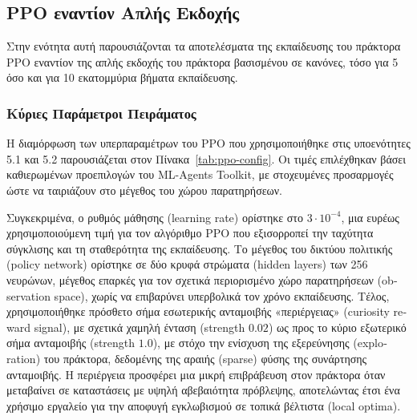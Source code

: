 \documentclass[12pt]{article}
\begin{document}
\subsection{PPO εναντίον Απλής Εκδοχής}
Στην ενότητα αυτή παρουσιάζονται τα αποτελέσματα της εκπαίδευσης του πράκτορα PPO εναντίον της απλής εκδοχής του πράκτορα βασισμένου σε κανόνες, τόσο για 5 όσο και για 10 εκατομμύρια βήματα εκπαίδευσης.

\subsubsection{Κύριες Παράμετροι Πειράματος}
Η διαμόρφωση των υπερπαραμέτρων του PPO που χρησιμοποιήθηκε στις υποενότητες 5.1 και 5.2 παρουσιάζεται στον Πίνακα~\ref{tab:ppo-config}.  Οι τιμές επιλέχθηκαν βάσει καθιερωμένων προεπιλογών του ML-Agents Toolkit, με στοχευμένες προσαρμογές ώστε να ταιριάζουν στο μέγεθος του χώρου παρατηρήσεων. 

Συγκεκριμένα, ο ρυθμός μάθησης (\foreignlanguage{english}{learning rate}) ορίστηκε στο $3 \cdot 10^{-4}$, μια ευρέως χρησιμοποιούμενη τιμή για τον αλγόριθμο \foreignlanguage{english}{PPO} που εξισορροπεί την ταχύτητα σύγκλισης και τη σταθερότητα της εκπαίδευσης. Το μέγεθος του δικτύου πολιτικής (\foreignlanguage{english}{policy network}) ορίστηκε σε δύο κρυφά στρώματα (\foreignlanguage{english}{hidden layers}) των 256 νευρώνων, μέγεθος επαρκές για τον σχετικά περιορισμένο χώρο παρατηρήσεων (\foreignlanguage{english}{observation space}), χωρίς να επιβαρύνει υπερβολικά τον χρόνο εκπαίδευσης. Τέλος, χρησιμοποιήθηκε πρόσθετο σήμα εσωτερικής ανταμοιβής «περιέργειας» (\foreignlanguage{english}{curiosity reward signal}), με σχετικά χαμηλή ένταση (\foreignlanguage{english}{strength} $0.02$) ως προς το κύριο εξωτερικό σήμα ανταμοιβής (\foreignlanguage{english}{strength} $1.0$), με στόχο την ενίσχυση της εξερεύνησης (\foreignlanguage{english}{exploration}) του πράκτορα, δεδομένης της αραιής (\foreignlanguage{english}{sparse}) φύσης της συνάρτησης ανταμοιβής. Η περιέργεια προσφέρει μια μικρή επιβράβευση στον πράκτορα όταν μεταβαίνει σε καταστάσεις με υψηλή αβεβαιότητα πρόβλεψης, αποτελώντας έτσι ένα χρήσιμο εργαλείο για την αποφυγή εγκλωβισμού σε τοπικά βέλτιστα (\foreignlanguage{english}{local optima}).
\end{document}
